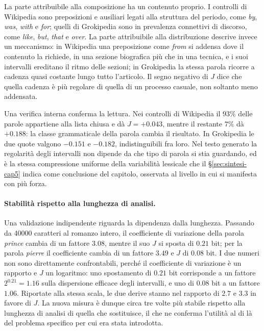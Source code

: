 La parte attribuibile alla composizione ha un contenuto proprio. I controlli di
Wikipedia sono preposizioni e ausiliari legati alla struttura del periodo, come
\emph{by}, \emph{was}, \emph{with} e \emph{for}; quelli di Grokipedia sono in
prevalenza connettivi di discorso, come \emph{like}, \emph{but}, \emph{that} e
\emph{over}. La parte attribuibile alla distribuzione descrive invece un
meccanismo: in Wikipedia una preposizione come \emph{from} si addensa dove il
contenuto la richiede, in una sezione biografica più che in una tecnica, e i suoi
intervalli ereditano il ritmo delle sezioni; in Grokipedia la stessa parola
ricorre a cadenza quasi costante lungo tutto l'articolo. Il segno negativo di $J$
dice che quella cadenza è più regolare di quella di un processo casuale, non
soltanto meno addensata.

Una verifica interna conferma la lettura. Nei controlli di Wikipedia il $93\%$
delle parole appartiene alla lista chiusa e dà $J = +0.043$, mentre il restante
$7\%$ dà $+0.188$: la classe grammaticale della parola cambia il risultato. In
Grokipedia le due quote valgono $-0.151$ e $-0.182$, indistinguibili fra loro.
Nel testo generato la regolarità degli intervalli non dipende da che tipo di
parola si stia guardando, ed è la stessa compressione uniforme della variabilità
lessicale che il §\ref{sec:sintesi-cap5} indica come conclusione del capitolo,
osservata al livello in cui si manifesta con più forza.

\paragraph{Stabilità rispetto alla lunghezza di analisi.}
Una validazione indipendente riguarda la dipendenza dalla lunghezza. Passando
da \num{40000} caratteri al romanzo intero, il coefficiente di variazione della
parola \emph{prince} cambia di un fattore $3.08$, mentre il suo $J$ si sposta di
$0.21$ bit; per la parola \emph{pierre} il coefficiente cambia di un fattore
$3.49$ e $J$ di $0.08$ bit. I due numeri non sono direttamente confrontabili,
perché il coefficiente di variazione è un rapporto e $J$ un logaritmo: uno
spostamento di $0.21$ bit corrisponde a un fattore $2^{0.21} = 1.16$ sulla
dispersione efficace degli intervalli, e uno di $0.08$ bit a un fattore $1.06$.
Riportate alla stessa scala, le due derive stanno nel rapporto di $2.7$ e $3.3$
in favore di $J$. La nuova misura è dunque circa tre volte più stabile rispetto
alla lunghezza di analisi di quella che sostituisce, il che ne conferma
l'utilità al di là del problema specifico per cui era stata introdotta.


